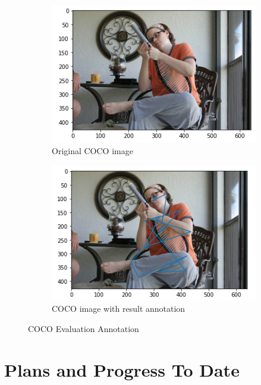 \documentclass[11pt, letterpaper]{article}
\begin{document}
\begin{figure}[h]
    \centering
    \begin{subfigure}{0.4\textwidth}
        \includegraphics[width=\linewidth]{annotated_evaluation_image.png}
        \caption{Original COCO image \cite{coco_data}}
    \end{subfigure}
    \begin{subfigure}{0.4\textwidth}
        \includegraphics[width=\linewidth]{original_evaluation_image.png}
        \caption{COCO image with result annotation}
    \end{subfigure}
    \caption{COCO Evaluation Annotation}
    \label{fig:coco_evaluation_annotation}
\end{figure}

\section{Plans and Progress To Date}
\end{document}
